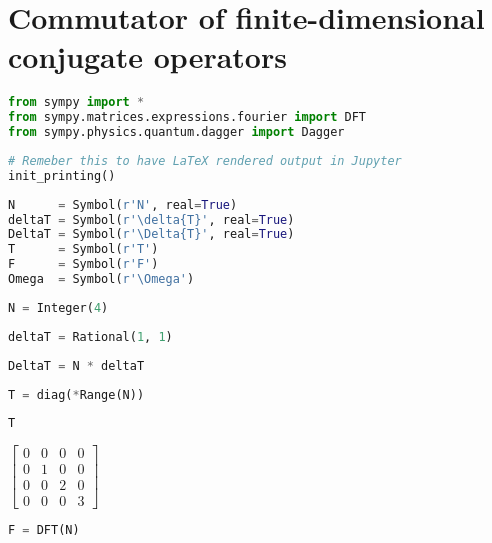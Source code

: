 \section{Commutator of finite-dimensional conjugate operators}\label{sec:jpynb:finite-comm}

\begin{lstlisting}[language=Python]
from sympy import *
from sympy.matrices.expressions.fourier import DFT
from sympy.physics.quantum.dagger import Dagger
\end{lstlisting}

\begin{lstlisting}[language=Python]
# Remeber this to have LaTeX rendered output in Jupyter
init_printing()
\end{lstlisting}

\begin{lstlisting}[language=Python]
N      = Symbol(r'N', real=True)
deltaT = Symbol(r'\delta{T}', real=True)
DeltaT = Symbol(r'\Delta{T}', real=True)
T      = Symbol(r'T')
F      = Symbol(r'F')
Omega  = Symbol(r'\Omega')
\end{lstlisting}

\begin{lstlisting}[language=Python]
N = Integer(4)
\end{lstlisting}

\begin{lstlisting}[language=Python]
deltaT = Rational(1, 1)
\end{lstlisting}

\begin{lstlisting}[language=Python]
DeltaT = N * deltaT
\end{lstlisting}

\begin{lstlisting}[language=Python]
T = diag(*Range(N))
\end{lstlisting}

\begin{lstlisting}[language=Python]
T
\end{lstlisting}

\(\displaystyle \left[\begin{matrix}0 & 0 & 0 & 0\\0 & 1 & 0 & 0\\0 & 0 & 2 & 0\\0 & 0 & 0 & 3\end{matrix}\right]\)

\begin{lstlisting}[language=Python]
F = DFT(N)
\end{lstlisting}

